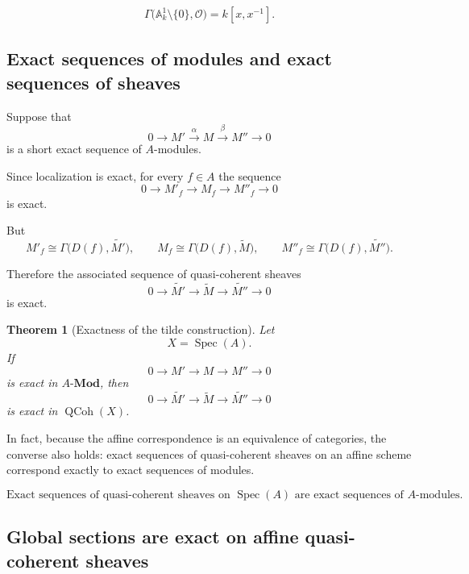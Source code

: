 \documentclass[12pt,a4paper]{article}
\newtheorem{theorem}{Theorem}[section]
\theoremstyle{notespace}
\begin{document}
\[
\boxed{
	\Gamma\bigl(\mathbb{A}^{1}_{k}\setminus\{0\},\mathcal{O}\bigr)
	=
	k[x,x^{-1}].
}
\]

\subsection{Exact sequences of modules and exact sequences of sheaves}

Suppose that
\[
0
\longrightarrow
M'
\xrightarrow{\alpha}
M
\xrightarrow{\beta}
M''
\longrightarrow
0
\]
is a short exact sequence of \(A\)-modules.

Since localization is exact, for every \(f\in A\) the sequence
\[
0
\longrightarrow
M'_{f}
\longrightarrow
M_{f}
\longrightarrow
M''_{f}
\longrightarrow
0
\]
is exact.

But
\[
M'_{f}
\cong
\Gamma\bigl(D(f),\widetilde{M'}\bigr),
\qquad
M_{f}
\cong
\Gamma\bigl(D(f),\widetilde{M}\bigr),
\qquad
M''_{f}
\cong
\Gamma\bigl(D(f),\widetilde{M''}\bigr).
\]

Therefore the associated sequence of quasi-coherent sheaves
\[
0
\longrightarrow
\widetilde{M'}
\longrightarrow
\widetilde{M}
\longrightarrow
\widetilde{M''}
\longrightarrow
0
\]
is exact.

\begin{theorem}[Exactness of the tilde construction]
	Let
	\[
	X=\operatorname{Spec}(A).
	\]
	If
	\[
	0
	\longrightarrow
	M'
	\longrightarrow
	M
	\longrightarrow
	M''
	\longrightarrow
	0
	\]
	is exact in \(A\text{-}\mathbf{Mod}\), then
	\[
	0
	\longrightarrow
	\widetilde{M'}
	\longrightarrow
	\widetilde{M}
	\longrightarrow
	\widetilde{M''}
	\longrightarrow
	0
	\]
	is exact in \(\operatorname{QCoh}(X)\).
\end{theorem}

In fact, because the affine correspondence is an equivalence of categories,
the converse also holds: exact sequences of quasi-coherent sheaves on an
affine scheme correspond exactly to exact sequences of modules.

\[
\boxed{
	\text{Exact sequences of quasi-coherent sheaves on }\operatorname{Spec}(A)
	\text{ are exact sequences of }A\text{-modules.}
}
\]

\subsection{Global sections are exact on affine quasi-coherent sheaves}
\end{document}
